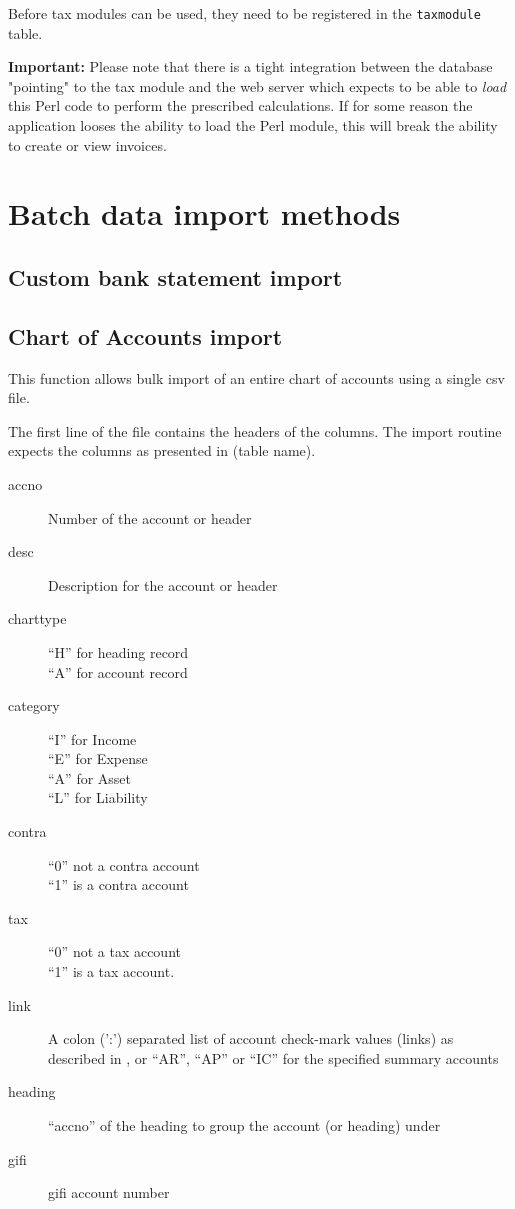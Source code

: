 Before tax modules can be used, they need to be registered in the \texttt{taxmodule} table.

\textbf{Important:} Please note that there is a tight integration between the database "pointing"
to the tax module and the web server which expects to be able to \textit{load} this Perl code to
perform the prescribed calculations.
If for some reason the application looses the ability to load the Perl module, this will break
the ability to create or view invoices.

\chapter{Batch data import methods}
\label{cha-customization-batch-import}

\section{Custom bank statement import}
\label{sec-customization-batch-import-bank-statement}

\section{Chart of Accounts import}
\label{subsec-customization-import-coa}

This function allows bulk import of an entire chart of accounts using a
single \gls{csv} file.

The first line of the file contains the headers of the columns. The
import routine expects the columns as presented in (table name).

\begin{description}
\item [accno] Number of the account or header
\item [desc] Description for the account or header
\item [charttype] ``H'' for heading record \\
``A'' for account record
\item [category] ``I'' for Income \\
``E'' for Expense \\
``A'' for Asset \\
``L'' for Liability
\item [contra] ``0'' not a \gls{contra} account \\
``1'' is a \gls{contra} account
\item [tax] ``0'' not a tax account \\
``1'' is a tax account.
\item [link] A colon (':') separated list of account check-mark values (links) as described
    in , or ``AR'', ``AP'' or ``IC'' for the specified summary accounts
\item [heading] ``accno'' of the heading to group the account (or heading) under
\item [gifi] \gls{gifi} account number
\end{description}

